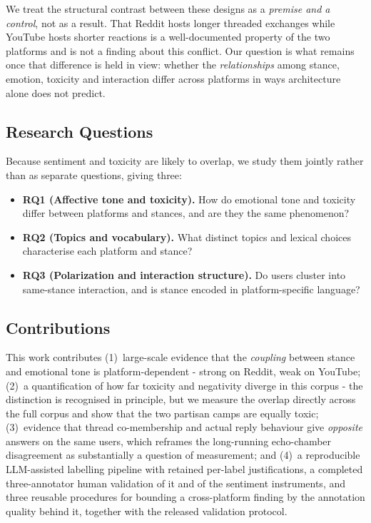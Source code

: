 We treat the structural contrast between these designs as a \emph{premise and a
control}, not as a result. That Reddit hosts longer threaded exchanges while YouTube
hosts shorter reactions is a well-documented property of the two platforms and is
not a finding about this conflict. Our question is what remains once that difference
is held in view: whether the \emph{relationships} among stance, emotion, toxicity and
interaction differ across platforms in ways architecture alone does not predict.

\subsection{Research Questions}
Because sentiment and toxicity are likely to overlap, we study them jointly rather
than as separate questions, giving three:

\begin{itemize}[leftmargin=1.2em,itemsep=1pt,topsep=2pt]
  \item \textbf{RQ1 (Affective tone and toxicity).} How do emotional tone and
  toxicity differ between platforms and stances, and are they the same phenomenon?
  \item \textbf{RQ2 (Topics and vocabulary).} What distinct topics and lexical
  choices characterise each platform and stance?
  \item \textbf{RQ3 (Polarization and interaction structure).} Do users cluster into
  same-stance interaction, and is stance encoded in platform-specific language?
\end{itemize}

\subsection{Contributions}
This work contributes (1)~large-scale evidence that the \emph{coupling} between
stance and emotional tone is platform-dependent - strong on Reddit, weak on
YouTube; (2)~a quantification of how far toxicity and negativity
diverge in this corpus - the distinction is recognised in principle, but we measure
the overlap directly across the full corpus and show that the two partisan camps
are equally toxic; (3)~evidence that thread co-membership and actual reply
behaviour give \emph{opposite} answers on the same users, which reframes the
long-running echo-chamber disagreement as substantially a question of measurement; and (4)~a reproducible LLM-assisted labelling
pipeline with retained per-label justifications, a completed three-annotator human validation of it and of the sentiment instruments, and three reusable procedures for bounding a cross-platform finding by the annotation quality behind it, together with the released validation
protocol.

